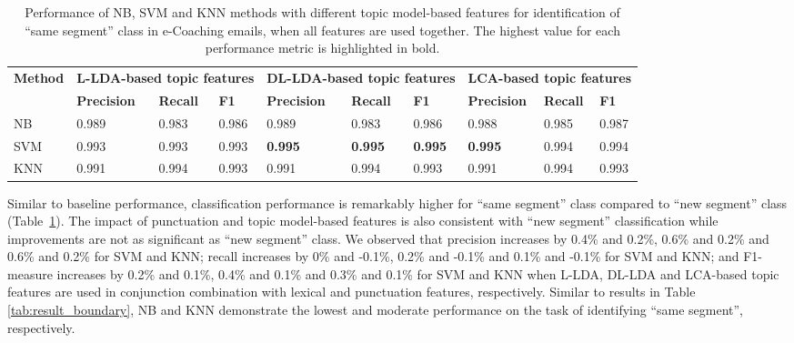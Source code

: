 \documentclass{amia}
\begin{document}
\begin{table}[ht]
\centering
\caption{Performance of NB, SVM and KNN methods with different topic model-based features for identification of ``same segment'' class in e-Coaching emails, when all features are used together. The highest value for each performance metric is highlighted in bold.}
\label{tab:result_not_boundary}
  \begin{tabular}{|l|l|l|l|l|l|l|l|l|l|}
  \hline
   \multirow{2}{*}{\textbf{Method}} & \multicolumn{3}{|c|}{\textbf{L-LDA-based topic features}} & \multicolumn{3}{|c|}{\textbf{DL-LDA-based topic features}}  & \multicolumn{3}{|c|}{\textbf{LCA-based topic features}} \\\cline{2-10} & \textbf{Precision}  & \textbf{Recall} & \textbf{F1} & \textbf{Precision}  & \textbf{Recall} & \textbf{F1} & \textbf{Precision}  & \textbf{Recall} & \textbf{F1}\\ \hline  
    
 NB & 0.989 & 0.983 & 0.986 & 0.989 & 0.983 & 0.986 & 0.988 & 0.985 & 0.987 \\ \hline
 SVM & 0.993 & 0.993 & 0.993 & \textbf{0.995} & \textbf{0.995} & \textbf{0.995} & \textbf{0.995} & 0.994 & 0.994  \\ \hline
 KNN & 0.991 & 0.994 & 0.993 & 0.991 & 0.994 & 0.993 & 0.991 & 0.994 & 0.993 \\ \hline
  \end{tabular}
\end{table}         

Similar to baseline performance, classification performance is remarkably higher for ``same segment'' class compared to ``new segment'' class (Table~\ref{tab:result_not_boundary}). The impact of punctuation and topic model-based features is also consistent with ``new segment'' classification while improvements are not as significant as ``new segment'' class. We observed that precision increases by 0.4\% and 0.2\%, 0.6\% and 0.2\% and 0.6\% and 0.2\% for SVM and KNN; recall increases by 0\% and -0.1\%, 0.2\% and -0.1\% and 0.1\% and -0.1\% for SVM and KNN; and F1-measure increases by 0.2\% and 0.1\%, 0.4\% and 0.1\% and 0.3\% and 0.1\% for SVM and KNN when L-LDA, DL-LDA and LCA-based topic features are used in conjunction combination with lexical and punctuation features, respectively. Similar to results in Table \ref{tab:result_boundary}, NB and KNN demonstrate the lowest and moderate performance on the task of identifying ``same segment'', respectively. \\   
\end{document}
